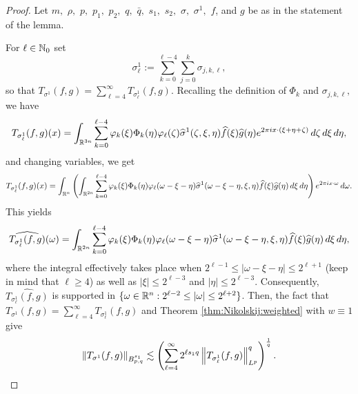 \begin{proof}  Let $m,$ $\rho,$ $p,$ $p_1,$ $p_2,$ $q,$ $\bar{q},$ $s_1,$  $s_2,$ $\sigma,$ $\sigma^1,$ $f$, and $g$ be as in the statement of the lemma. 

For $\ell \in \naz$  set
$$
\sigma^1_\ell:=  \sum\limits_{k=0}^{\ell -4} \sum\limits_{j =0}^{k} \sigma_{j,k,\ell},
$$
so that $T_{\sigma^1}(f,g)= \sum\limits_{\ell=4}^\infty T_{\sigma^1_\ell}(f,g)$. Recalling the definition of $\Phi_k$ and $\sigma_{j,k,\ell},$ we have
\begin{align*}
T_{\sigma^1_\ell}(f,g)(x)= \int_{\re^{3n}} \sum\limits_{k=0}^{\ell -4}   \fk(\xi) \Phi_k(\eta)  \f_\ell(\zeta) \widehat{\sigma}^1(\zeta, \xi, \eta) \widehat{f}(\xi) \widehat{g}(\eta) e^{2\pi i x \cdot (\xi + \eta + \zeta)}  \dzeta \dxi \deta,
\end{align*}
and changing variables, we get
\begin{align*}
T_{\sigma^1_\ell}(f,g)(x)= \int_{\rn} \left( \int_{\rtn}  \sum\limits_{k=0}^{\ell -4}   \fk(\xi) \Phi_k(\eta)  \f_\ell(\omega- \xi - \eta) \widehat{\sigma}^1(\omega- \xi - \eta, \xi, \eta) \widehat{f}(\xi) \widehat{g}(\eta) \dxi \deta \right)  e^{2\pi i x \cdot \omega} \, d\omega.
\end{align*}
This yields
\begin{align*}
\widehat{T_{\sigma^1_\ell}(f,g)}(\omega)=  \int_{\rtn}  \sum\limits_{k=0}^{\ell -4}   \fk(\xi) \Phi_k(\eta)  \f_\ell(\omega- \xi - \eta) \widehat{\sigma}^1(\omega- \xi - \eta, \xi, \eta) \widehat{f}(\xi) \widehat{g}(\eta) \dxi \deta,
\end{align*}
where the integral effectively takes place when $ 2^{\ell-1}\le |\omega- \xi - \eta| \leq 2^{\ell +1}$ (keep in mind that $\ell\ge 4$)  as well as $|\xi| \leq 2^{\ell-3}$ and $|\eta| \leq 2^{\ell-3}.$  Consequently,
$\widehat{T_{\sigma^1_\ell}(f,g)}$ is supported in $\{\omega\in\rn: 2^{\ell-2}\le |\omega| \leq 2^{\ell +2}\}$. Then, the fact that  $T_{\sigma^1}(f,g)= \sum\limits_{\ell=4}^\infty T_{\sigma^1_\ell}(f,g)$  and Theorem \ref{thm:Nikolskij:weighted} with $w\equiv 1$ give
\begin{equation}\label{eq:T:sigma:1:fg}
\norm{T_{\sigma^1}(f,g)}{\ibes{p}{s_1}{q}} \lesssim  \left( \sum\limits_{\ell=4}^\infty 2^{\ell s_1q} \norm{T_{\sigma^1_\ell}(f,g)}{{L^p}}^q \right)^\frac{1}{q}.
\end{equation}


\end{proof}
